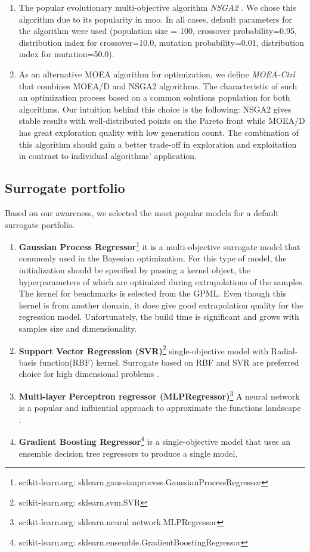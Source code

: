     \begin{enumerate}
        \item The popular evolutionary multi-objective algorithm \emph{NSGA2} \cite{DebAPM00}. We chose this algorithm due to its popularity in \gls{moo}. In all cases, default parameters for the algorithm were used (population size = 100, crossover probability=0.95, distribution index for crossover=10.0, mutation probability=0.01, distribution index for mutation=50.0)\cite{francesco_biscani_2019}.
        \item As an alternative MOEA algorithm for optimization, we define \emph{MOEA-Ctrl} that combines MOEA/D \cite{ZhangL07} and NSGA2 algorithms. The characteristic of such an optimization process based on a common solutions population for both algorithms. Our intuition behind this choice is the following: NSGA2 gives stable results with well-distributed points on the Pareto front while MOEA/D has great exploration quality with low generation count. The combination of this algorithm should gain a better trade-off in exploration and exploitation in contrast to individual algorithms' application.  
    \end{enumerate}

    \subsection{Surrogate portfolio}
    Based on our awareness, we selected the most popular models for a default surrogate portfolio.
    \begin{enumerate}
        \item \textbf{Gaussian Process Regressor}\footnote{{scikit-learn.org}: sklearn.gaussianprocess.GaussianProcessRegressor} it is a multi-objective surrogate model that commonly used in the Bayesian optimization. For this type of model, the initialization should be specified by passing a kernel object, the hyperparameters of which are optimized during extrapolations of the samples.  The kernel for benchmarks is selected from the GPML\cite{RasmussenN10}. Even though this kernel is from another domain, it does give good extrapolation quality for the regression model. Unfortunately, the build time is significant and grows with samples size and dimensionality.
        \item \textbf{Support Vector Regression (SVR)}\footnote{{scikit-learn.org}: sklearn.svm.SVR} single-objective model with Radial-basis function(RBF) kernel. Surrogate based on RBF and SVR are preferred choice for high dimensional problems \cite{akhtar2019efficient}.
        \item \textbf{Multi-layer Perceptron regressor (MLPRegressor)}\footnote{{scikit-learn.org}: sklearn.neural network.MLPRegressor} A neural network is a popular and influential approach to approximate the functions landscape \cite{KOURAKOS201313}.
        \item \textbf{Gradient Boosting Regressor}\footnote{{scikit-learn.org}: sklearn.ensemble.GradientBoostingRegressor} is a single-objective model that uses an ensemble decision tree regressors to produce a single model.
    \end{enumerate}
    
